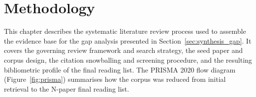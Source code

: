 \section{Methodology}
\label{sec:methodology}

This chapter describes the systematic literature review process used to
assemble the evidence base for the gap analysis presented in
Section~\ref{sec:synthesis_gap}. It covers the governing review framework
and search strategy, the seed paper and corpus design, the citation
snowballing and screening procedure, and the resulting bibliometric profile
of the final reading list. The PRISMA 2020 flow diagram
(Figure~\ref{fig:prisma}) summarises how the corpus was reduced from initial
retrieval to the N-paper final reading list.

 